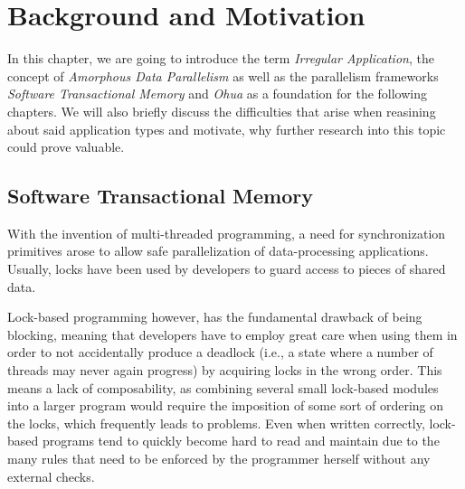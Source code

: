 %
\chapter{Background and Motivation}%
\label{sec:background}

In this chapter, we are going to introduce the term \emph{Irregular Application}, the concept of \emph{Amorphous Data Parallelism} as well as the parallelism frameworks \emph{Software Transactional Memory} and \emph{Ohua} as a foundation for the following chapters.
We will also briefly discuss the difficulties that arise when reasining about said application types and motivate, why further research into this topic could prove valuable.

\section{Software Transactional Memory}

With the invention of multi-threaded programming, a need for synchronization primitives arose to allow safe parallelization of data-processing applications.
Usually, locks have been used by developers to guard access to pieces of shared data.

Lock-based programming however, has the fundamental drawback of being blocking, meaning that developers have to employ great care when using them in order to not accidentally produce a deadlock (i.e., a state where a number of threads may never again progress) by acquiring locks in the wrong order.
This means a lack of composability, as combining several small lock-based modules into a larger program would require the imposition of some sort of ordering on the locks, which frequently leads to problems.
Even when written correctly, lock-based programs tend to quickly become hard to read and maintain due to the many rules that need to be enforced by the programmer herself without any external checks.


